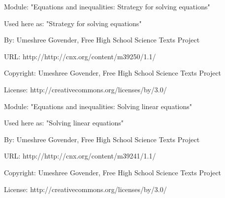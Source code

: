       \par\vspace{9pt}\noindent\begin{minipage}{\textwidth}
      Module: "Equations and inequalities: Strategy for solving equations" \par\nopagebreak\noindent
      Used here as: "Strategy for solving equations" \par\nopagebreak\noindent
        By: Umeshree Govender, Free High School Science Texts Project\par\nopagebreak\noindent
      URL: http://http://cnx.org/content/m39250/1.1/\par\nopagebreak\noindent
      \par\nopagebreak\noindent
      Copyright: Umeshree Govender, Free High School Science Texts Project\par\nopagebreak\noindent
      License:  http://creativecommons.org/licenses/by/3.0/\par\nopagebreak\noindent
      \par\end{minipage}
      \par\vspace{9pt}\noindent\begin{minipage}{\textwidth}
      Module: "Equations and inequalities: Solving linear equations" \par\nopagebreak\noindent
      Used here as: "Solving linear equations" \par\nopagebreak\noindent
        By: Umeshree Govender, Free High School Science Texts Project\par\nopagebreak\noindent
      URL: http://http://cnx.org/content/m39241/1.1/\par\nopagebreak\noindent
      \par\nopagebreak\noindent
      Copyright: Umeshree Govender, Free High School Science Texts Project\par\nopagebreak\noindent
      License:  http://creativecommons.org/licenses/by/3.0/\par\nopagebreak\noindent
      \par\end{minipage}
